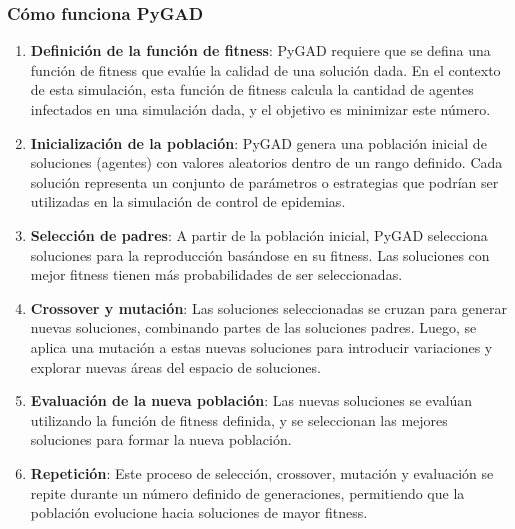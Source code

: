 \subsubsection{Cómo funciona PyGAD}
\begin{enumerate}
    \item \textbf{Definición de la función de fitness}: PyGAD requiere que se defina una función de fitness que evalúe la calidad de una solución dada. En el contexto de esta simulación, esta función de fitness calcula la cantidad de agentes infectados en una simulación dada, y el objetivo es minimizar este número.
    \item \textbf{Inicialización de la población}: PyGAD genera una población inicial de soluciones (agentes) con valores aleatorios dentro de un rango definido. Cada solución representa un conjunto de parámetros o estrategias que podrían ser utilizadas en la simulación de control de epidemias.
    \item \textbf{Selección de padres}: A partir de la población inicial, PyGAD selecciona soluciones para la reproducción basándose en su fitness. Las soluciones con mejor fitness tienen más probabilidades de ser seleccionadas.
    \item \textbf{Crossover y mutación}: Las soluciones seleccionadas se cruzan para generar nuevas soluciones, combinando partes de las soluciones padres. Luego, se aplica una mutación a estas nuevas soluciones para introducir variaciones y explorar nuevas áreas del espacio de soluciones.
    \item \textbf{Evaluación de la nueva población}: Las nuevas soluciones se evalúan utilizando la función de fitness definida, y se seleccionan las mejores soluciones para formar la nueva población.
    \item \textbf{Repetición}: Este proceso de selección, crossover, mutación y evaluación se repite durante un número definido de generaciones, permitiendo que la población evolucione hacia soluciones de mayor fitness.
\end{enumerate}

